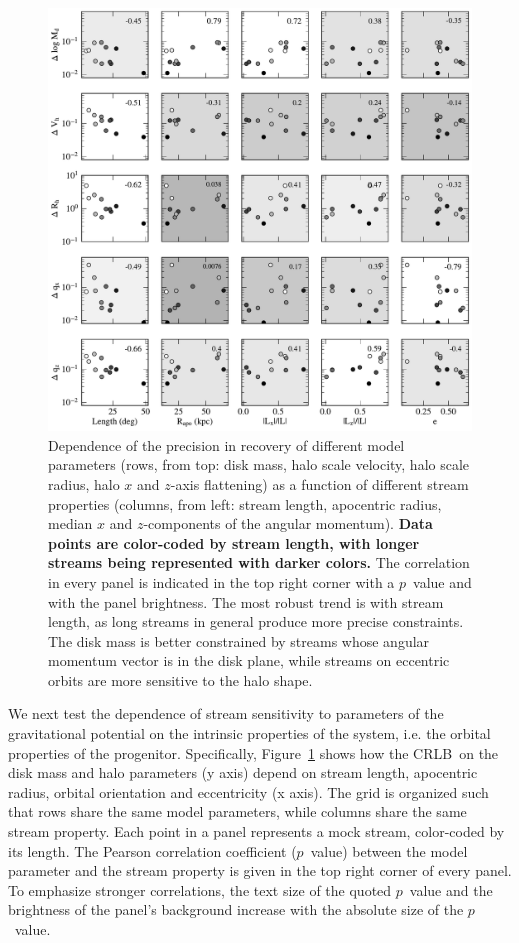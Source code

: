 \documentclass[modern]{aastex62}
\newcommand{\acronym}[1]{{\small{#1}}}
\newcommand{\CRLB}{\acronym{CRLB}}
\begin{document}
\begin{figure}
\begin{center}
\includegraphics[width=\textwidth]{orbit_correlations.pdf}
\caption{Dependence of the precision in recovery of different model parameters (rows, from top: disk mass, halo scale velocity, halo scale radius, halo $x$ and $z$-axis flattening) as a function of different stream properties (columns, from left: stream length, apocentric radius, median $x$ and $z$-components of the angular momentum).
{\bf Data points are color-coded by stream length, with longer streams being represented with darker colors.}
The correlation in every panel is indicated in the top right corner with a $p$~value and with the panel brightness.
The most robust trend is with stream length, as long streams in general produce more precise constraints.
The disk mass is better constrained by streams whose angular momentum vector is in the disk plane, while streams on eccentric orbits are more sensitive to the halo shape.}
\label{fig:orbit_correlations}
\end{center}
\end{figure}

We next test the dependence of stream sensitivity to parameters of the gravitational potential on the intrinsic properties of the system, i.e. the orbital properties of the progenitor.
Specifically, Figure~\ref{fig:orbit_correlations} shows how the \CRLB\ on the disk mass and halo parameters (y axis) depend on stream length, apocentric radius, orbital orientation and eccentricity (x axis).
The grid is organized such that rows share the same model parameters, while columns share the same stream property.
Each point in a panel represents a mock stream, color-coded by its length.
The Pearson correlation coefficient ($p$~value) between the model parameter and the stream property is given in the top right corner of every panel.
To emphasize stronger correlations, the text size of the quoted $p$~value and the brightness of the panel's background increase with the absolute size of the $p$~value.
\end{document}
